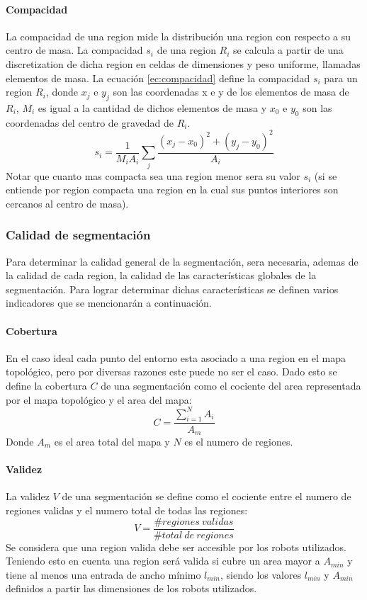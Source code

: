 \paragraph{Compacidad}
La compacidad de una region mide la distribución una region con respecto a su centro de masa. La compacidad $s_i$ de una region $R_i$ se calcula a partir de una discretization de dicha region en celdas de dimensiones y peso uniforme, llamadas elementos de masa. La ecuación \ref{ec:compacidad} define la compacidad $s_i$ para un region $R_i$, donde $x_j$ e $y_j$ son las coordenadas x e y de los elementos de masa de $R_i$, $M_i$ es igual a la cantidad de dichos elementos de masa y $x_0$ e $y_0$ son las coordenadas del centro de gravedad de $R_i$.
\begin{equation}
  s_i=\frac{1}{M_iA_i}\sum_j \frac{(x_j-x_0)^2 + (y_j-y_0)^2}{A_i} \label{ec:compacidad}
\end{equation}
Notar que cuanto mas compacta sea una region menor sera su valor $s_i$ (si se entiende por region compacta una region en la cual sus puntos interiores son cercanos al centro de masa).

\subsubsection{Calidad de segmentación}
Para determinar la calidad general de la segmentación, sera necesaria, ademas de la calidad de cada region, la calidad de las características globales de la segmentación. Para lograr determinar dichas características se definen varios indicadores que se mencionarán a continuación.

\paragraph{Cobertura}
En el caso ideal cada punto del entorno esta asociado a una region en el mapa topológico, pero por diversas razones este puede no ser el caso. Dado esto se define la cobertura $C$ de una segmentación como el cociente del area representada por el mapa topológico y el area del mapa:
\begin{equation}
C=\frac{\sum^N_{i=1} A_i}{A_m}
\end{equation}
Donde $A_m$ es el area total del mapa y $N$ es el numero de regiones.

\paragraph{Validez}
La validez $V$ de una segmentación se define como el cociente entre el numero de regiones validas y el numero total de todas las regiones:
\begin{equation}
  V=\frac{\#regiones\ validas}{\#total\ de\ regiones}
\end{equation}
Se considera que una region valida debe ser accesible por los robots utilizados. Teniendo esto en cuenta una region será valida si cubre un area mayor a $A_{min}$ y tiene al menos una entrada de ancho mínimo $l_{min}$, siendo los valores $l_{min}$ y $A_{min}$ definidos a partir las dimensiones de los robots utilizados.

